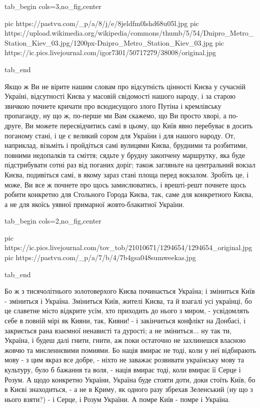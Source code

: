 \ifcmt
  tab_begin cols=3,no_fig,center

     pic https://pastvu.com/_p/a/8/j/e/8jeldfm0lshd68u05l.jpg
		 pic https://upload.wikimedia.org/wikipedia/commons/thumb/5/54/Dnipro_Metro_Station_Kiev_03.jpg/1200px-Dnipro_Metro_Station_Kiev_03.jpg
		 pic https://ic.pics.livejournal.com/igor7301/50717279/38008/original.jpg

  tab_end
\fi

Якщо ж Ви не вірите нашим словам про відсутність цінності Києва у сучасній
Україні, відсутності Києва у масовій свідомості нашого народу, і за старою
звичкою почнете кричати про всюдисущого злого Путіна і кремлівську пропаганду,
ну що ж, по-перше ми Вам скажемо, що Ви просто хворі, а по-друге, Ви можете
пересвідчитись самі в цьому, що Київ явно перебуває в досить поганому стані, і
це є великий сором для України і для нашого народу. От, наприклад, візьміть і
пройдіться самі вулицями Києва, брудними та розбитими, повними недопалків та
сміття; сядьте у брудну закопчену маршрутку, яка буде підстрибувати сотні раз
від поганих доріг; також загляньте на центральний вокзал Києва, подивіться
самі, в якому зараз стані площа перед вокзалом.  Зробіть це, і може, Ви все ж
почнете про щось замислюватись, і врешті-решт почнете щось робити конкретно для
Стольного Города Києва, так, саме для конкретного Києва, а не для якоїсь уявної
примарної жовто-блакитної України. 


\ifcmt
  tab_begin cols=2,no_fig,center

     pic https://ic.pics.livejournal.com/tov_tob/21010671/1294654/1294654_original.jpg
		 pic https://pastvu.com/_p/a/7/b/4/7b4gsa048sumweekas.jpg

  tab_end
\fi

Бо ж з тисячолітнього золотоверхого Києва починається Україна; і зміниться Київ
- зміниться і Україна. Зміниться Київ, жителі Києва, та й взагалі усі українці,
бо це славетне місто відкрите усім, хто приходить до нього з миром, -
усвідомлять себе в повній мірі як Кияни, так, Кияни! - і закінчиться конфлікт
на Донбасі, і закриється рана взаємної ненависті та дурості; а не зміниться...
ну так ти, Україна, і будеш далі гнити, гнити, аж поки остаточно не захлинешся
власною жовчю та мисленнєвими помиями.  Бо нація вмирає не тоді, коли у неї
відбирають мову - з цим якраз все добре, - ніхто не заважає розвивати
українську мову та культуру, було б бажання та воля, - нація вмирає тоді, коли
вмирає її Серце і Розум. А щодо конкретно України, Україна буде стояти доти,
доки стоїть Київ, бо в Києві знаходиться, - а не в Криму, як одного разу
збрехав Зеленський (ну що з нього взяти?) - і Серце, і Розум України. А помре
Київ - помре і Україна.

